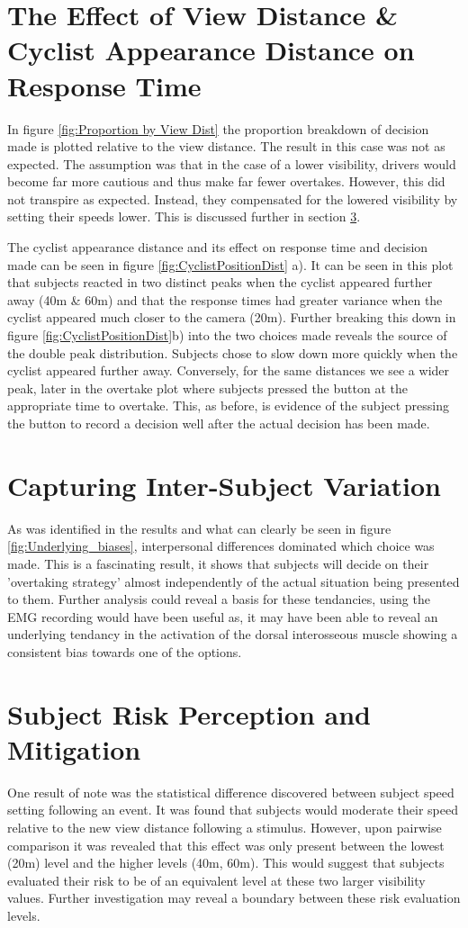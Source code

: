 \section{The Effect of View Distance \& Cyclist Appearance Distance on Response Time}
In figure \ref{fig:Proportion by View Dist} the proportion breakdown of decision made is plotted relative to the view distance. The result in this case was not as expected. The assumption was that in the case of a lower visibility, drivers would become far more cautious and thus make far fewer overtakes. However, this did not transpire as expected. Instead, they compensated for the lowered visibility by setting their speeds lower. This is discussed further in section \ref{secForRef}.

The cyclist appearance distance and its effect on response time and decision made can be seen in figure \ref{fig:CyclistPositionDist} a). It can be seen in this plot that subjects reacted in two distinct peaks when the cyclist appeared further away (40m \& 60m) and that the response times had greater variance when the cyclist appeared much closer to the camera (20m). Further breaking this down in figure \ref{fig:CyclistPositionDist}b) into the two choices made reveals the source of the double peak distribution. Subjects chose to slow down more quickly when the cyclist appeared further away. Conversely, for the same distances we see a wider peak, later in the overtake plot where subjects pressed the button at the appropriate time to overtake. This, as before, is evidence of the subject pressing the button to record a decision well after the actual decision has been made.

\section{Capturing Inter-Subject Variation}
As was identified in the results and what can clearly be seen in figure \ref{fig:Underlying_biases}, interpersonal differences dominated which choice was made. This is a fascinating result, it shows that subjects will decide on their 'overtaking strategy' almost independently of the actual situation being presented to them. Further analysis could reveal a basis for these tendancies, using the EMG recording would have been useful as, it may have been able to reveal an underlying tendancy in the activation of the dorsal interosseous muscle showing a consistent bias towards one of the options.

\section{Subject Risk Perception and Mitigation}
\label{secForRef}
One result of note was the statistical difference discovered between subject speed setting following an event. It was found that subjects would moderate their speed relative to the new view distance following a stimulus. However, upon pairwise comparison it was revealed that this effect was only present between the lowest (20m) level and the higher levels (40m, 60m). This would suggest that subjects evaluated their risk to be of an equivalent level at these two larger visibility values. Further investigation may reveal a boundary between these risk evaluation levels.

